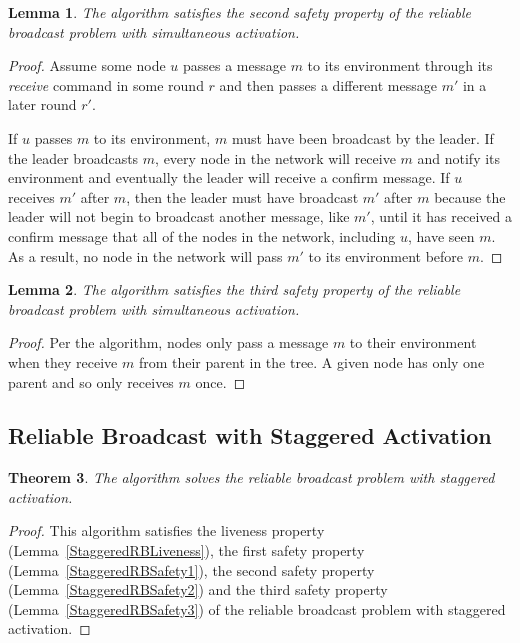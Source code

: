 \documentclass[english]{article}
\newtheorem{theorem}{Theorem}[section]
\newtheorem{lemma}[theorem]{Lemma}
\begin{document}
\begin{lemma}
\label{StaticRBSafety2}
The algorithm satisfies the second safety property of the reliable broadcast problem with simultaneous activation.
\end{lemma}
\begin{proof}

Assume some node $u$ passes a message $m$ to its environment through its \textit{receive} command in some round $r$ and then passes a different message $m'$ in a later round $r'$. 

If $u$ passes $m$ to its environment, $m$ must have been broadcast by the leader. If the leader broadcasts $m$, every node in the network will receive $m$ and notify its environment and eventually the leader will receive a confirm message. If $u$ receives $m'$ after $m$, then the leader must have broadcast $m'$ after $m$ because the leader will not begin to broadcast another message, like $m'$, until it has received a confirm message that all of the nodes in the network, including $u$, have seen $m$. As a result, no node in the network will pass $m'$ to its environment before $m$.

\end{proof}

\begin{lemma}
\label{StaticRBSafety3}
  The algorithm satisfies the third safety property of the reliable broadcast problem with simultaneous activation.
\end{lemma}
\begin{proof}

Per the algorithm, nodes only pass a message $m$ to their environment when they receive $m$ from their parent in the tree. A given node has only one parent and so only receives $m$ once.

\end{proof}



\subsection {Reliable Broadcast with Staggered Activation}

\begin{theorem}
\label{StaggeredReliableBroadcast}
  The algorithm solves the reliable broadcast problem with staggered activation.
\end{theorem}
\begin{proof}
This algorithm satisfies the liveness property (Lemma~\ref{StaggeredRBLiveness}), 
the first safety property (Lemma~\ref{StaggeredRBSafety1}),
the second safety property (Lemma~\ref{StaggeredRBSafety2}) and 
the third safety property (Lemma~\ref{StaggeredRBSafety3}) of the reliable broadcast problem with staggered activation.
\end{proof}
\end{document}
